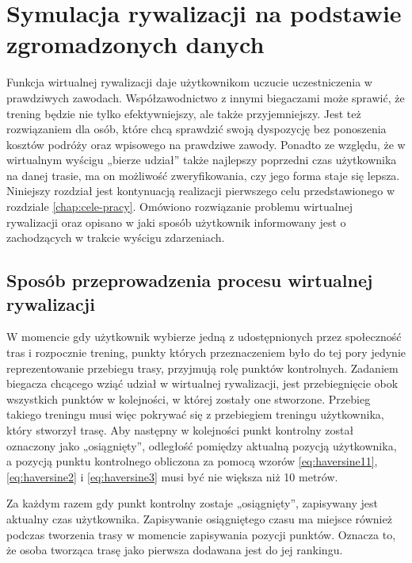 \chapter{Symulacja rywalizacji na podstawie zgromadzonych danych}\label{chap:symulacja-rywalizacji}
Funkcja wirtualnej rywalizacji daje użytkownikom uczucie uczestniczenia w prawdziwych zawodach. Współzawodnictwo z innymi biegaczami może sprawić, że trening będzie nie tylko efektywniejszy, ale także przyjemniejszy. Jest też rozwiązaniem dla osób, które chcą sprawdzić swoją dyspozycję bez ponoszenia kosztów podróży oraz wpisowego na prawdziwe zawody. Ponadto ze względu, że w wirtualnym wyścigu „bierze udział” także najlepszy poprzedni czas użytkownika na danej trasie, ma on możliwość zweryfikowania, czy jego forma staje się lepsza. Niniejszy rozdział jest kontynuacją realizacji pierwszego celu przedstawionego w rozdziale \ref{chap:cele-pracy}. Omówiono rozwiązanie problemu wirtualnej rywalizacji oraz opisano w jaki sposób użytkownik informowany jest o zachodzących w trakcie wyścigu zdarzeniach.
\section{Sposób przeprowadzenia procesu wirtualnej rywalizacji}\label{chapter:sposob-rywalizacji}
W momencie gdy użytkownik wybierze jedną z udostępnionych przez społeczność tras i rozpocznie trening, punkty których przeznaczeniem było do tej pory jedynie reprezentowanie przebiegu trasy, przyjmują rolę punktów kontrolnych. Zadaniem biegacza chcącego wziąć udział w wirtualnej rywalizacji, jest przebiegnięcie obok wszystkich punktów w kolejności, w której zostały one stworzone. Przebieg takiego treningu musi więc pokrywać się z przebiegiem treningu użytkownika, który stworzył trasę. Aby następny w kolejności punkt kontrolny został oznaczony jako „osiągnięty”, odległość pomiędzy aktualną pozycją użytkownika, a pozycją punktu kontrolnego obliczona za pomocą wzorów \ref{eq:haversine11},  \ref{eq:haversine2} i \ref{eq:haversine3} musi być nie większa niż 10 metrów.

Za każdym razem gdy punkt kontrolny zostaje „osiągnięty”, zapisywany jest aktualny czas użytkownika. Zapisywanie osiągniętego czasu ma miejsce również podczas tworzenia trasy w momencie zapisywania pozycji punktów. Oznacza to, że osoba tworząca trasę jako pierwsza dodawana jest do jej rankingu.

